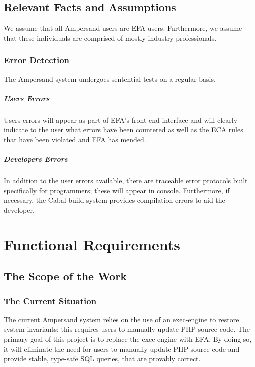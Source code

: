 \documentclass[12pt]{report}
\begin{document}

\section{Relevant Facts and Assumptions}\label{sec:Assumptions}
We assume that all Ampersand users are EFA users. Furthermore, we assume that 
these individuals are comprised of mostly industry professionals.

\subsection{Error Detection}\label{subsec:ErrorDetection}
The Ampersand system undergoes sentential tests on a regular basis.
\paragraph{Users Errors \\}
\noindent
Users errors will appear as part of EFA's front-end interface and will clearly 
indicate to the user what errors have been countered as well as the ECA rules 
that have been violated and EFA has mended.
\paragraph{Developers Errors \\}
\noindent
In addition to the user errors available, there are traceable error protocols 
built specifically for programmers; these will appear in console. Furthermore, 
if necessary, the Cabal build system provides compilation errors to aid the 
developer.

\chapter{Functional Requirements}\label{ch:Functional}
\section{The Scope of the Work}\label{sec:ScopeOfWork}

\subsection{The Current Situation}\label{subsec:CurrentSituation}
The current Ampersand system relies on the use of an exec-engine to restore 
system invariants; this requires users to manually update PHP source code. The 
primary goal of this project is to replace the exec-engine with EFA. By doing 
so, it will eliminate the need for users to manually update PHP source code and 
provide stable, type-safe SQL queries, that are provably correct.
\end{document}
